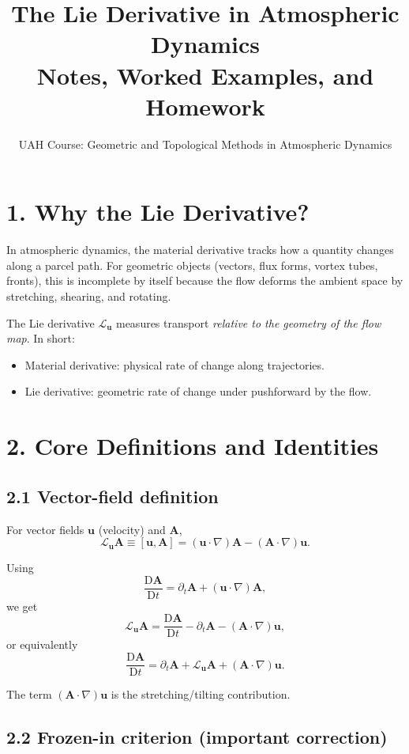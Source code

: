 \documentclass[11pt]{article}
\title{The Lie Derivative in Atmospheric Dynamics\\
\large Notes, Worked Examples, and Homework}
\author{UAH Course: Geometric and Topological Methods in Atmospheric Dynamics}
\date{}
\newcommand{\Lie}{\mathcal{L}}
\newcommand{\DD}{\mathrm{D}}
\begin{document}
\maketitle

\section*{1. Why the Lie Derivative?}

In atmospheric dynamics, the material derivative tracks how a quantity changes along a parcel path. For geometric objects (vectors, flux forms, vortex tubes, fronts), this is incomplete by itself because the flow deforms the ambient space by stretching, shearing, and rotating.

The Lie derivative $\Lie_{\mathbf{u}}$ measures transport \emph{relative to the geometry of the flow map}. In short:
\begin{itemize}
  \item Material derivative: physical rate of change along trajectories.
  \item Lie derivative: geometric rate of change under pushforward by the flow.
\end{itemize}

\section*{2. Core Definitions and Identities}

\subsection*{2.1 Vector-field definition}

For vector fields $\mathbf{u}$ (velocity) and $\mathbf{A}$,
\[
\Lie_{\mathbf{u}}\mathbf{A} \equiv [\mathbf{u},\mathbf{A}] = (\mathbf{u}\cdot\nabla)\mathbf{A} - (\mathbf{A}\cdot\nabla)\mathbf{u}.
\]

Using
\[
\frac{\DD \mathbf{A}}{\DD t} = \partial_t \mathbf{A} + (\mathbf{u}\cdot\nabla)\mathbf{A},
\]
we get
\[
\Lie_{\mathbf{u}}\mathbf{A}
= \frac{\DD \mathbf{A}}{\DD t} - \partial_t\mathbf{A} - (\mathbf{A}\cdot\nabla)\mathbf{u},
\]
or equivalently
\[
\frac{\DD \mathbf{A}}{\DD t}
= \partial_t\mathbf{A} + \Lie_{\mathbf{u}}\mathbf{A} + (\mathbf{A}\cdot\nabla)\mathbf{u}.
\]

The term $(\mathbf{A}\cdot\nabla)\mathbf{u}$ is the stretching/tilting contribution.

\subsection*{2.2 Frozen-in criterion (important correction)}
\end{document}

